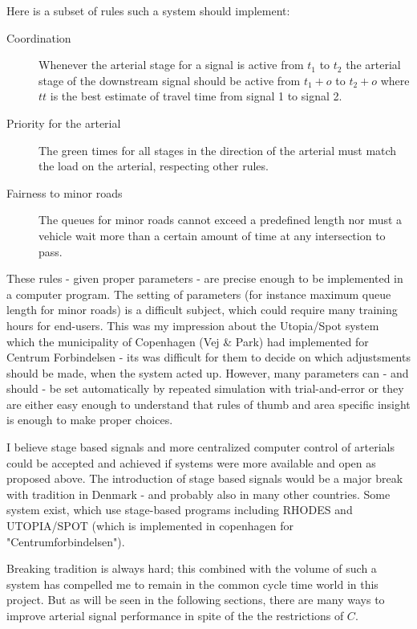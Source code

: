 Here is a subset of rules such a system should implement:

\begin{description}
\item[Coordination]
Whenever the arterial stage for a signal is active from $t_1$ to $t_2$ the arterial stage of the downstream signal should be active from $t_1 + o$ to $t_2 + o$ where $tt$ is the best estimate of travel time from signal 1 to signal 2.
\item[Priority for the arterial]
The green times for all stages in the direction of the arterial must match the load on the arterial, respecting other rules.
\item[Fairness to minor roads]
The queues for minor roads cannot exceed a predefined length nor must a vehicle wait more than a certain amount of time at any intersection to pass.
\end{description}

These rules - given proper parameters - are precise enough to be implemented in a computer program. The setting of parameters (for instance maximum queue length for minor roads) is a difficult subject, which could require many training hours for end-users. This was my impression about the Utopia/Spot system which the municipality of Copenhagen (Vej \& Park) had implemented for Centrum Forbindelsen - its was difficult for them to decide on which adjustsments should be made, when the system acted up. 
However, many parameters can - and should - be set automatically by repeated simulation with trial-and-error or they are either easy enough to understand that rules of thumb and area specific insight is enough to make proper choices.

I believe stage based signals and more centralized computer control of arterials could be accepted and achieved if systems were more available and open as proposed above. The introduction of stage based signals would be a major break with tradition in Denmark - and probably also in many other countries. Some system exist, which use stage-based programs including RHODES \cite{rhodes} and UTOPIA/SPOT \cite{utopia_spot} (which is implemented in copenhagen for "Centrumforbindelsen").

Breaking tradition is always hard; this combined with the volume of such a system has compelled me to remain in the common cycle time world in this project. But as will be seen in the following sections, there are many ways to improve arterial signal performance in spite of the the restrictions of $C$.


